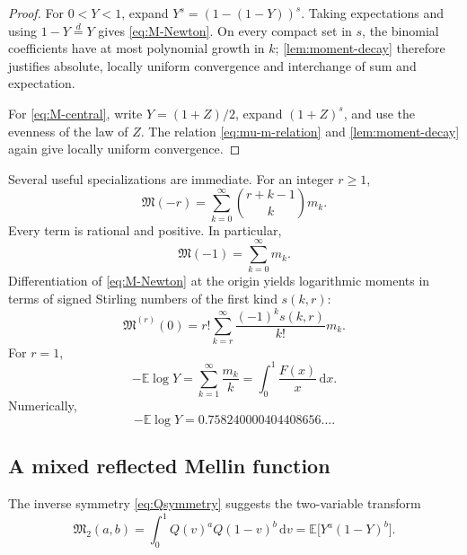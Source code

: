 \documentclass[11pt,oneside]{article}
\theoremstyle{definition}
\newcommand{\F}{F}
\newcommand{\Q}{Q}
\newcommand{\M}{\mathfrak M}
\newcommand{\E}{\mathbb E}
\newcommand{\dd}{\,\mathrm d}
\begin{document}
\begin{proof}
For \(0<Y<1\), expand
\(Y^s=(1-(1-Y))^s\).  Taking expectations and using
\(1-Y\overset d=Y\) gives \cref{eq:M-Newton}.  On every compact set in \(s\), the
binomial coefficients have at most polynomial growth in \(k\); \cref{lem:moment-decay}
therefore justifies absolute, locally uniform convergence and interchange of sum and
expectation.

For \cref{eq:M-central}, write \(Y=(1+Z)/2\), expand \((1+Z)^s\), and use the
evenness of the law of \(Z\).  The relation \cref{eq:mu-m-relation} and
\cref{lem:moment-decay} again give locally uniform convergence.
\end{proof}

Several useful specializations are immediate.  For an integer \(r\ge1\),
\begin{equation}\label{eq:negative-moment-rational-series}
 \M(-r)=\sum_{k=0}^{\infty}\binom{r+k-1}{k}m_k.
\end{equation}
Every term is rational and positive.  In particular,
\begin{equation}\label{eq:Mminus1-series}
 \M(-1)=\sum_{k=0}^{\infty}m_k.
\end{equation}
Differentiation of \cref{eq:M-Newton} at the origin yields logarithmic moments in
terms of signed Stirling numbers of the first kind \(s(k,r)\):
\begin{equation}\label{eq:log-moment-Stirling}
 \M^{(r)}(0)
 =r!\sum_{k=r}^{\infty}\frac{(-1)^ks(k,r)}{k!}m_k.
\end{equation}
For \(r=1\),
\begin{equation}\label{eq:log-moment-constant}
 -\E\log Y
 =\sum_{k=1}^{\infty}\frac{m_k}{k}
 =\int_0^1\frac{\F(x)}x\dd x.
\end{equation}
Numerically,
\begin{equation}\label{eq:log-moment-numeric}
 -\E\log Y=0.758240000404408656\ldots.
\end{equation}

\subsection{A mixed reflected Mellin function}

The inverse symmetry \cref{eq:Qsymmetry} suggests the two-variable transform
\begin{equation}\label{eq:M2def}
 \M_2(a,b)=\int_0^1\Q(v)^a\Q(1-v)^b\dd v
 =\E\bigl[Y^a(1-Y)^b\bigr].
\end{equation}
\end{document}

